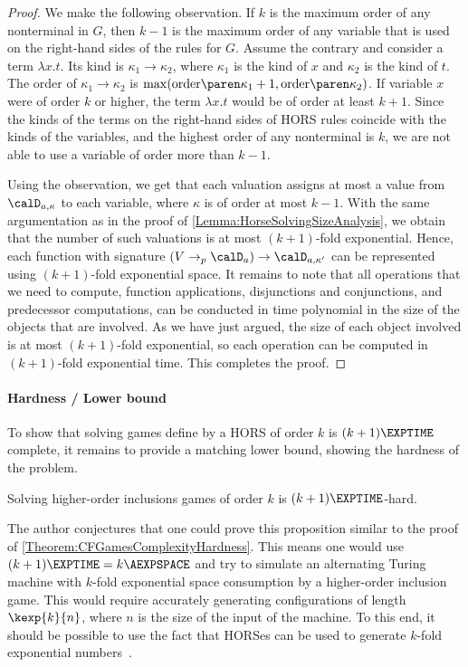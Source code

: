 \documentclass[../../diss.tex]{subfiles}
\begin{document}
\begin{proof}
    We make the following observation.
    If $k$ is the maximum order of any nonterminal in $G$, then $k-1$ is the maximum order of any variable that is used on the right-hand sides of the rules for $G$.
    Assume the contrary and consider a term $\lambda x . t$.
    Its kind is $\kappa_1 \to \kappa_2$, where $\kappa_1$ is the kind of $x$ and $\kappa_2$ is the kind of $t$.
    The order of $\kappa_1 \to \kappa_2$ is $\max(\horsorder{\kappa_1} +1, \horsorder{\kappa_2})$.
    If variable $x$ were of order $k$ or higher, the term $\lambda x . t$ would be of order at least $k+1$.
    Since the kinds of the terms on the right-hand sides of HORS rules coincide with the kinds of the variables, and the highest order of any nonterminal is $k$, we are not able to use a variable of order more than $k-1$.

    Using the observation, we get that each valuation assigns at most a value from $\domaina{\kappa}$ to each variable, where $\kappa$ is of order at most $k-1$.
    With the same argumentation as in the proof of \cref{Lemma:HorseSolvingSizeAnalysis}, we obtain that the number of such valuations is at most $(k+1)$-fold exponential.
    Hence, each function with signature $(V \pto \domaina) \to \domaina{\kappa'}$ can be represented using $(k+1)$-fold exponential space.
    It remains to note that all operations that we need to compute, \eg function applications, disjunctions and conjunctions, and predecessor computations, can be conducted in time polynomial in the size of the objects that are involved.
    As we have just argued, the size of each object involved is at most $(k+1)$-fold exponential, so each operation can be computed in $(k+1)$-fold exponential time.
    This completes the proof.
\end{proof}

\paragraph{Hardness / Lower bound}

To show that solving games define by a HORS of order $k$ is $(k+1)\EXPTIME$ complete, it remains to provide a matching lower bound, showing the hardness of the problem.

\begin{proposition}%
\label{Proposition:HorseSolvingHardness}%
    Solving higher-order inclusions games of order $k$ is $(k+1)\EXPTIME$-hard.
\end{proposition}

The author conjectures that one could prove this proposition similar to the proof of \cref{Theorem:CFGamesComplexityHardness}.
This means one would use $(k+1)\EXPTIME = k\AEXPSPACE$ and try to simulate an alternating Turing machine with $k$-fold exponential space consumption by a higher-order inclusion game.
This would require accurately generating configurations of length $\kexp{k}{n}$, where $n$ is the size of the input of the machine.
To this end, it should be possible to use the fact that HORSes can be used to generate $k$-fold exponential numbers~\cite{CachatW07}.
\end{document}
